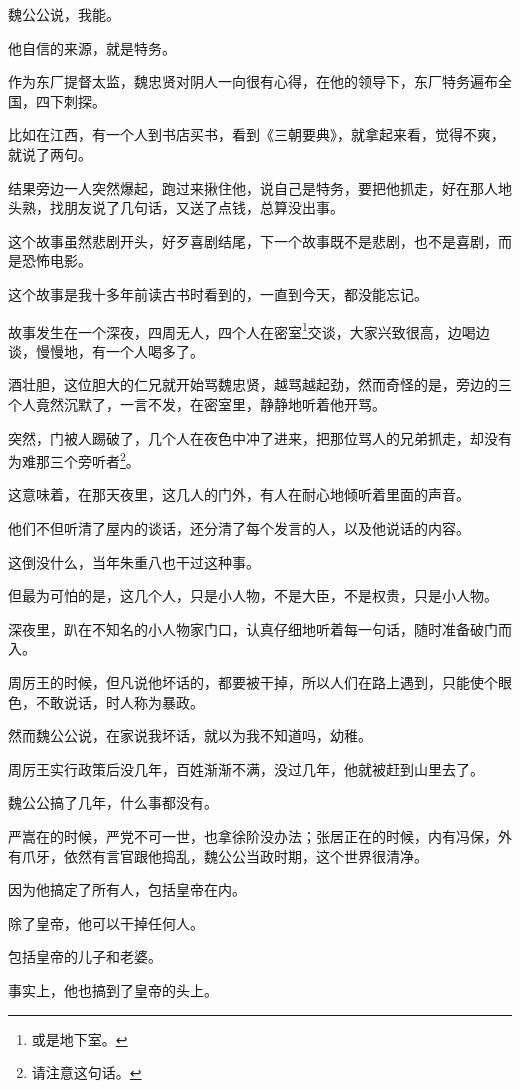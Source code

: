 \begin{multicols}{\theparacolNo}
魏公公说，我能。

他自信的来源，就是特务。

作为东厂提督太监，魏忠贤对阴人一向很有心得，在他的领导下，东厂特务遍布全国，四下刺探。

比如在江西，有一个人到书店买书，看到《三朝要典》，就拿起来看，觉得不爽，就说了两句。

结果旁边一人突然爆起，跑过来揪住他，说自己是特务，要把他抓走，好在那人地头熟，找朋友说了几句话，又送了点钱，总算没出事。

这个故事虽然悲剧开头，好歹喜剧结尾，下一个故事既不是悲剧，也不是喜剧，而是恐怖电影。

这个故事是我十多年前读古书时看到的，一直到今天，都没能忘记。

故事发生在一个深夜，四周无人，四个人在密室\footnote{或是地下室。}交谈，大家兴致很高，边喝边谈，慢慢地，有一个人喝多了。

酒壮胆，这位胆大的仁兄就开始骂魏忠贤，越骂越起劲，然而奇怪的是，旁边的三个人竟然沉默了，一言不发，在密室里，静静地听着他开骂。

突然，门被人踢破了，几个人在夜色中冲了进来，把那位骂人的兄弟抓走，却没有为难那三个旁听者\footnote{请注意这句话。}。

这意味着，在那天夜里，这几人的门外，有人在耐心地倾听着里面的声音。

他们不但听清了屋内的谈话，还分清了每个发言的人，以及他说话的内容。

这倒没什么，当年朱重八也干过这种事。

但最为可怕的是，这几个人，只是小人物，不是大臣，不是权贵，只是小人物。

深夜里，趴在不知名的小人物家门口，认真仔细地听着每一句话，随时准备破门而入。

周厉王的时候，但凡说他坏话的，都要被干掉，所以人们在路上遇到，只能使个眼色，不敢说话，时人称为暴政。

然而魏公公说，在家说我坏话，就以为我不知道吗，幼稚。

周厉王实行政策后没几年，百姓渐渐不满，没过几年，他就被赶到山里去了。

魏公公搞了几年，什么事都没有。

严嵩在的时候，严党不可一世，也拿徐阶没办法；张居正在的时候，内有冯保，外有爪牙，依然有言官跟他捣乱，魏公公当政时期，这个世界很清净。

因为他搞定了所有人，包括皇帝在内。

除了皇帝，他可以干掉任何人。

包括皇帝的儿子和老婆。

事实上，他也搞到了皇帝的头上。


\end{multicols}
